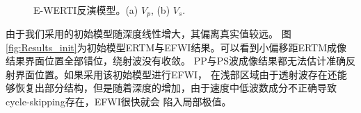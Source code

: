 \begin{figure}[!htb]
   \centering
   \\
   \caption{E-WERTI反演模型。(a) $V_p$, (b) $V_s$.}
   \label{fig:InvertedModel_WERTI}
\end{figure}
由于我们采用的初始模型随深度线性增大，其偏离真实值较远。
图\ref{fig:Results_init}为初始模型ERTM与EFWI结果。可以看到小偏移距ERTM成像结果界面位置全部错位，绕射波没有收敛。
PP与PS波成像结果都无法估计准确反射界面位置。如果采用该初始模型进行EFWI，
在浅部区域由于透射波存在还能够恢复出部分结构，但是随着深度的增加，由于速度中低波数成分不正确导致cycle-skipping存在，EFWI很快就会
陷入局部极值。

